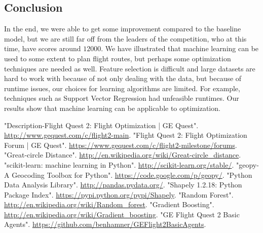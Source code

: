 \documentclass{article}[12pt]
\begin{document}
\begin{multicols}{2}
\section{Conclusion}
In the end, we were able to get some improvement compared to the baseline model, but we are still far off from the leaders of the competition, who at this time, have scores around $12000$. We have illustrated that machine learning can be used to some extent to plan flight routes, but perhaps some optimization techniques are needed as well. Feature selection is difficult and large datasets are hard to work with because of not only dealing with the data, but because of runtime issues, our choices for learning algorithms are limited. For example, techniques such as Support Vector Regression had unfeasible runtimes. Our results show that machine learning can be applicable to optimization.


\begin{thebibliography}{1}

 "Description-Flight Quest 2: Flight Optimization | GE Quest". \url{http://www.gequest.com/c/flight2-main}.
 "Flight Quest 2: Flight Optimization Forum | GE Quest". \url{https://www.gequest.com/c/flight2-milestone/forums}.
 "Great-circle Distance". \url{http://en.wikipedia.org/wiki/Great-circle_distance}.
 "scikit-learn: machine learning in Python". \url{http://scikit-learn.org/stable/}.
 "geopy-A Geocoding Toolbox for Python". \url{https://code.google.com/p/geopy/}.
 "Python Data Analysis Library". \url{http://pandas.pydata.org/}.
 "Shapely 1.2.18: Python Package Index". \url{https://pypi.python.org/pypi/Shapely}.
 "Random Forest". \url{http://en.wikipedia.org/wiki/Random_forest}.
 "Gradient Boosting". \url{http://en.wikipedia.org/wiki/Gradient_boosting}.
 "GE Flight Quest 2 Basic Agents". \url{https://github.com/benhamner/GEFlight2BasicAgents}.
\end{thebibliography}
\end{multicols}
\end{document}
